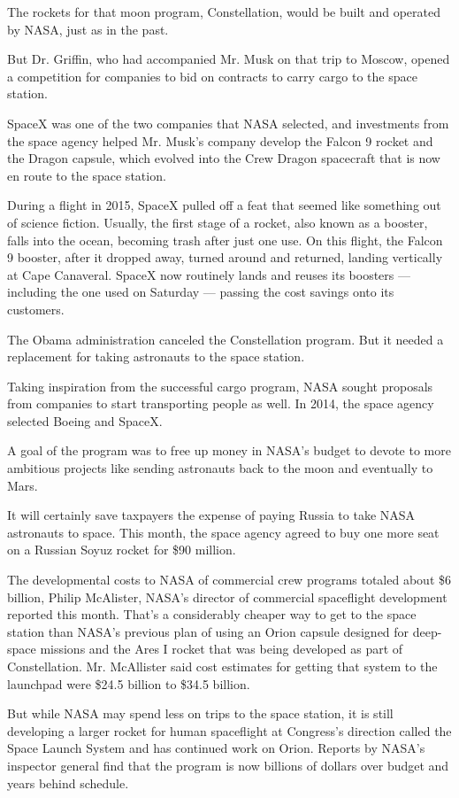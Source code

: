 The rockets for that moon program, Constellation, would be built and
operated by NASA, just as in the past.

But Dr. Griffin, who had accompanied Mr. Musk on that trip to Moscow,
opened a competition for companies to bid on contracts to carry cargo to
the space station.

SpaceX was one of the two companies that NASA selected, and investments
from the space agency helped Mr. Musk's company develop the Falcon 9
rocket and the Dragon capsule, which evolved into the Crew Dragon
spacecraft that is now en route to the space station.

During a flight in 2015, SpaceX pulled off a feat that seemed like
something out of science fiction. Usually, the first stage of a rocket,
also known as a booster, falls into the ocean, becoming trash after just
one use. On this flight, the Falcon 9 booster, after it dropped away,
turned around and returned, landing vertically at Cape Canaveral. SpaceX
now routinely lands and reuses its boosters --- including the one used
on Saturday --- passing the cost savings onto its customers.

The Obama administration canceled the Constellation program. But it
needed a replacement for taking astronauts to the space station.

Taking inspiration from the successful cargo program, NASA sought
proposals from companies to start transporting people as well. In 2014,
the space agency selected Boeing and SpaceX.

A goal of the program was to free up money in NASA's budget to devote to
more ambitious projects like sending astronauts back to the moon and
eventually to Mars.

It will certainly save taxpayers the expense of paying Russia to take
NASA astronauts to space. This month, the space agency agreed to buy one
more seat on a Russian Soyuz rocket for \$90 million.

The developmental costs to NASA of commercial crew programs totaled
about \$6 billion, Philip McAlister, NASA's director of commercial
spaceflight development reported this month. That's a considerably
cheaper way to get to the space station than NASA's previous plan of
using an Orion capsule designed for deep-space missions and the Ares I
rocket that was being developed as part of Constellation. Mr. McAllister
said cost estimates for getting that system to the launchpad were \$24.5
billion to \$34.5 billion.

But while NASA may spend less on trips to the space station, it is still
developing a larger rocket for human spaceflight at Congress's direction
called the Space Launch System and has continued work on Orion. Reports
by NASA's inspector general find that the program is now billions of
dollars over budget and years behind schedule.

